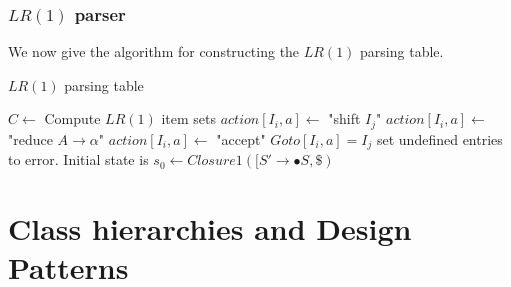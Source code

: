 \documentclass[oneside]{book}
\begin{document}
\subsection{$LR(1)$ parser}
We now give the algorithm for constructing the $LR(1)$ parsing table.
\begin{algorithm}
\caption{$LR(1)$ parsing table}
\begin{algorithmic}
\STATE $C \leftarrow$ Compute $LR(1)$ item sets
\STATE $action[I_i,a] \leftarrow$ "shift $I_j$"
\ENDIF
{}
\STATE $action[I_i,a] \leftarrow$ "reduce $A \rightarrow \alpha$"
\ENDIF
{}
\STATE $action[I_i,a] \leftarrow$ "accept"
\ENDIF
{}  
\STATE $Goto[I_i,a] = I_j$
\ENDIF
\STATE set undefined entries to error.
\STATE Initial state is $s_0 \leftarrow Closure1([S' \rightarrow \bullet S, \$)$
\end{algorithmic}
\end{algorithm}  

\chapter{Class hierarchies and Design Patterns}
\end{document}
